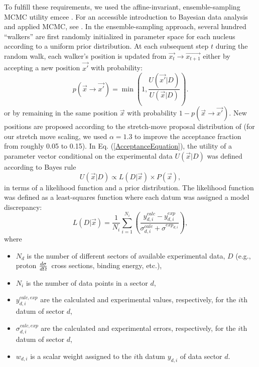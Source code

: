 \documentclass[twocolumn,secnumarabic,amssymb, nobibnotes, aps, prl,
superscriptaddress, nobalancelastpage]{revtex4}
\newcommand{\el}{\ensuremath{\frac{\lowercase{d}\sigma}{\lowercase{d}\Omega}}}
\begin{document}
To fulfill these requirements, we used the affine-invariant, ensemble-sampling
MCMC utility emcee \cite{Foreman-Mackey2013}. For an
accessible introduction to Bayesian data analysis and applied MCMC, see
\cite{Sharma2017}. In the ensemble-sampling approach, several hundred
``walkers'' are first randomly initialized in parameter space for each nucleus according to a
uniform prior distribution. At each subsequent step $t$ during the
random walk, each walker's position is updated from $\vec{x_{t}} \rightarrow
\vec{x_{t+1}}$ either by accepting a new position $\vec{x'}$ with probability:
\begin{equation}\label{AcceptanceEquation}
    p(\vec{x}\rightarrow \vec{x'}) = \min(1,\frac{U(\vec{x'}|D)}{U(\vec{x}|D)}).
\end{equation}
or by remaining in the same position $\vec{x}$ with probability
$1-p(\vec{x}\rightarrow \vec{x'})$. New positions are proposed according
to the stretch-move proposal distribution of \cite{Goodman2010} (for our stretch
move scaling, we used $\alpha = 1.3$ to improve the acceptance fraction from
roughly 0.05 to 0.15). In Eq.
(\ref{AcceptanceEquation}), the utility of a parameter vector conditional on the
experimental data $U(\vec{x}|D)$ was defined according to Bayes rule
\begin{equation}
    U(\vec{x}|D) \propto L(D|\vec{x}) \times P(\vec{x}),
\end{equation}
in terms of a likelihood function and a prior distribution. The likelihood
function was defined as a least-squares function where each datum was assigned
a model discrepancy:
\begin{equation} \label{LikelihoodFunction}
    L(D|\vec{x}) = \frac{1}{N_{i}} \sum_{i=1}^{N_{i}}
    \left(\frac{y^{calc}_{d,i}-y^{exp}_{d,i}}{\sigma^{calc}_{d,i}+\sigma^{exp_{d,i}}}\right),
\end{equation}
where
\begin{itemize}
    \item $N_{d}$ is the number of different sectors of available experimental
        data, $D$ (e.g., proton \el\ cross sections,
binding energy, etc.),
    \item $N_{i}$ is the number of data points in a sector $d$,
    \item $y^{calc, exp}_{d,i}$ are the calculated and experimental values,
        respectively, for the $i$th datum of sector $d$,
    \item $\sigma^{calc, exp}_{d,i}$ are the calculated and experimental errors,
        respectively, for the $i$th datum of sector $d$,
    \item $w_{d,i}$ is a scalar weight assigned to the $i$th datum
        $y_{d,i}$ of data sector $d$.
\end{itemize}
\end{document}
